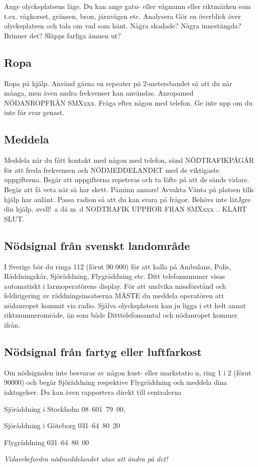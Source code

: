 Ange olycksplatsens läge. Du kan ange gatu- eller vägnamn eller riktmärken som
t.ex. vägkorset, gränsen, bron, järnvägen etc.  Analysera Gör en överblick över
olycksplatsen och tala om vad som hänt.  Några skadade? Några innestängda?
Brinner det? Släpps farliga ämnen ut?

\subsection{Ropa}

Ropa på hjälp. Använd gärna en repeater på 2-metersbandet så att du når många,
men även andra frekvenser kan användas.  Anropamed NÖDANROPFRÅN SMXxxx. Fråga
efter någon med telefon. Ge inte upp om du inte får svar genast.

\subsection{Meddela}

Meddela när du fått kontakt med någon med telefon, sänd NÖDTRAFIKPÅGÅR för att
freda frekvensen och NÖDMEDDELANDET med de viktigaste uppgifterna. Begär att
uppgifterna repeteras och ta löfte på att de sänds vidare. Begär att få veta när
så har skett. Påminn annars!  Avvakta Vänta på platsen tills hjälp har
anlänt. Passa radion så att du kan svara på frågor. Behövs inte lätJgre din
hjälp, avsll!~a då m~d NODTRAFIK UPPHOR FRAN SMXxxx .. KLART SLUT.

\subsection{Nödsignal från svenskt landområde}

I Sverige bör du ringa 112 (förut 90 000) för att kalla på Ambulans, Polis,
Räddningskår, Sjöräddning, Flygräddning etc. Ditt telefonnummer visas
automatiskt i larmoperatörens display.  För att undvika missförstånd och
feldirigering av räddningsinsatserna MÅSTE du meddela operatören att nödanropet
kommit via radio. Själva olycksplatsen kan ju ligga i ett helt annat
riktnummerområde, än som både Ditttelefonsamtal och nödanropet kommer ifrån.

\subsection{Nödsignal från fartyg eller luftfarkost}

Om nödsignalen inte besvaras av någon kust- eller markstatio n, ring 1 i 2
(förut 90000) och begär Sjöräddning respektive Flygräddning och meddela dina
iaktagelser. Du kan även rapportera direkt till centralerna

Sjöräddning i Stockholm 08--601~79~00,

Sjöräddning i Göteborg 031--64~80~20

Flygräddning 031--64~80~00

\emph{Vidarebefordra nödmeddelandet utan att ändra på det!}
